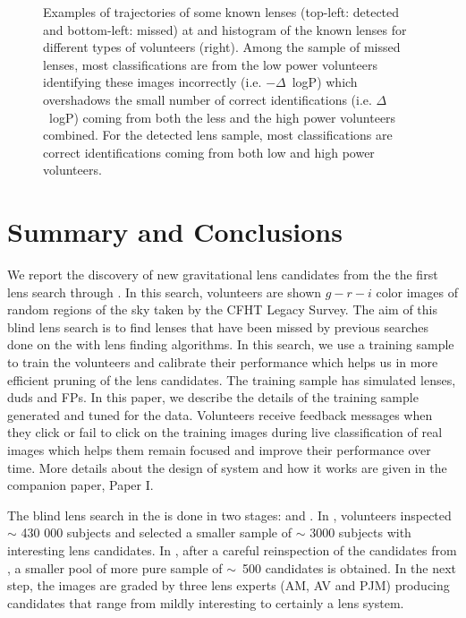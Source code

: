 \documentclass[useAMS,usenatbib,a4paper]{mn2e}
\begin{document}
\begin{figure}
\begin{center}
\caption{ \label{fig:detmis}
Examples of trajectories of some known lenses (top-left: detected and
bottom-left: missed) at \StageOne and histogram of the known lenses for
different types of volunteers (right). Among the sample of missed
lenses, most classifications are from the low power volunteers
identifying these images incorrectly (i.e. $-\Delta$~logP) which
overshadows the small number of correct identifications (i.e.
$\Delta$~logP) coming from both the less and the high power volunteers
combined. For the detected lens sample, most classifications are correct
identifications coming from both low and high power volunteers.
}
\end{center}
\end{figure}



\section{Summary and Conclusions}
\label{sec:conclude}

We report the discovery of new gravitational lens candidates from the
the first lens search through \sw. In this search, volunteers are shown
$g-r-i$ color images of random regions of the sky taken by the CFHT Legacy
Survey. The aim of this blind lens search is to find lenses that have been
missed by previous searches done on the \cfhtls with lens finding
algorithms. In this search, we use a training sample to train the
volunteers and calibrate their performance which helps us in more
efficient pruning of the lens candidates. The training sample has
simulated lenses, duds and FPs. In this paper, we describe the details
of the training sample generated and tuned for the \cfhtls data.
Volunteers receive feedback messages when they click or fail to click on
the training images during live classification of real images which
helps them remain focused and improve their performance over time. More
details about the design of \sw system and how it works are given in the
companion paper, Paper I.

The blind lens search in the \cfhtls is done in two stages: \StageOne and
\StageTwo. In \StageOne, volunteers inspected $\sim$ 430 000 subjects and
selected a smaller sample of $\sim$ 3000 subjects with interesting lens
candidates. In \StageTwo, after a careful reinspection of the candidates
from \StageOne, a smaller pool of more pure sample of $\sim$~500
candidates is obtained. In the next step, the images are graded by three
lens experts (AM, AV and PJM) producing candidates that range from
mildly interesting to certainly a lens system.
\end{document}
